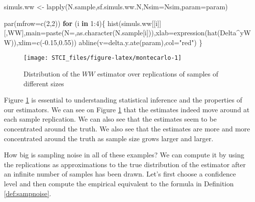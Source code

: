 \documentclass[
]{book}
\newenvironment{Shaded}{\begin{snugshade}}{\end{snugshade}}
\newcommand{\AttributeTok}[1]{\textcolor[rgb]{0.77,0.63,0.00}{#1}}
\newcommand{\ControlFlowTok}[1]{\textcolor[rgb]{0.13,0.29,0.53}{\textbf{#1}}}
\newcommand{\DecValTok}[1]{\textcolor[rgb]{0.00,0.00,0.81}{#1}}
\newcommand{\FloatTok}[1]{\textcolor[rgb]{0.00,0.00,0.81}{#1}}
\newcommand{\FunctionTok}[1]{\textcolor[rgb]{0.00,0.00,0.00}{#1}}
\newcommand{\NormalTok}[1]{#1}
\newcommand{\OtherTok}[1]{\textcolor[rgb]{0.56,0.35,0.01}{#1}}
\newcommand{\SpecialCharTok}[1]{\textcolor[rgb]{0.00,0.00,0.00}{#1}}
\newcommand{\StringTok}[1]{\textcolor[rgb]{0.31,0.60,0.02}{#1}}
\theoremstyle{definition}
\theoremstyle{definition}
\theoremstyle{definition}
\theoremstyle{definition}
\theoremstyle{remark}
\begin{document}
\begin{Shaded}
\begin{Highlighting}[]
\NormalTok{simuls.ww }\OtherTok{\textless{}{-}} \FunctionTok{lapply}\NormalTok{(N.sample,sf.simuls.ww.N,}\AttributeTok{Nsim=}\NormalTok{Nsim,}\AttributeTok{param=}\NormalTok{param)}

\FunctionTok{par}\NormalTok{(}\AttributeTok{mfrow=}\FunctionTok{c}\NormalTok{(}\DecValTok{2}\NormalTok{,}\DecValTok{2}\NormalTok{))}
\ControlFlowTok{for}\NormalTok{ (i }\ControlFlowTok{in} \DecValTok{1}\SpecialCharTok{:}\DecValTok{4}\NormalTok{)\{}
  \FunctionTok{hist}\NormalTok{(simuls.ww[[i]][,}\StringTok{\textquotesingle{}WW\textquotesingle{}}\NormalTok{],}\AttributeTok{main=}\FunctionTok{paste}\NormalTok{(}\StringTok{\textquotesingle{}N=\textquotesingle{}}\NormalTok{,}\FunctionTok{as.character}\NormalTok{(N.sample[i])),}\AttributeTok{xlab=}\FunctionTok{expression}\NormalTok{(}\FunctionTok{hat}\NormalTok{(Delta}\SpecialCharTok{\^{}}\NormalTok{yWW)),}\AttributeTok{xlim=}\FunctionTok{c}\NormalTok{(}\SpecialCharTok{{-}}\FloatTok{0.15}\NormalTok{,}\FloatTok{0.55}\NormalTok{))}
  \FunctionTok{abline}\NormalTok{(}\AttributeTok{v=}\FunctionTok{delta.y.ate}\NormalTok{(param),}\AttributeTok{col=}\StringTok{"red"}\NormalTok{)}
\NormalTok{\}}
\end{Highlighting}
\end{Shaded}

\begin{figure}[htbp]

{\centering \texttt{[image: STCI\_files/figure-latex/montecarlo-1]} 

}

\caption{Distribution of the $WW$ estimator over replications of samples of different sizes}\label{fig:montecarlo}
\end{figure}

Figure \ref{fig:montecarlo} is essential to understanding statistical inference and the properties of our estimators.
We can see on Figure \ref{fig:montecarlo} that the estimates indeed move around at each sample replication.
We can also see that the estimates seem to be concentrated around the truth.
We also see that the estimates are more and more concentrated around the truth as sample size grows larger and larger.

How big is sampling noise in all of these examples?
We can compute it by using the replications as approximations to the true distribution of the estimator after an infinite number of samples has been drawn.
Let's first choose a confidence level and then compute the empirical equivalent to the formula in Definition \ref{def:sampnoise}.
\end{document}
